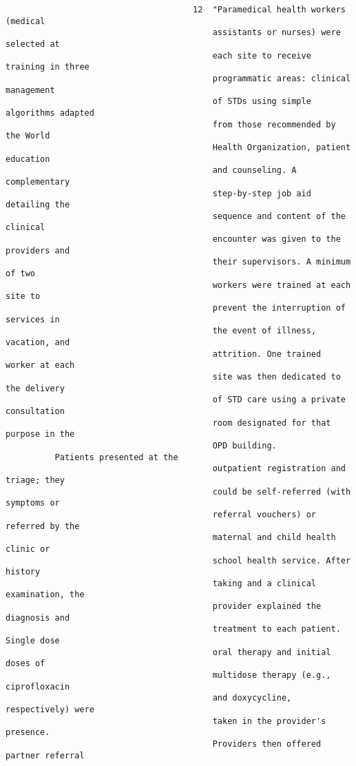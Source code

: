 \documentclass{article}
\begin{document}
\begin{verbatim}
                                      12  "Paramedical health workers (medical
                                          assistants or nurses) were selected at
                                          each site to receive training in three
                                          programmatic areas: clinical management
                                          of STDs using simple algorithms adapted
                                          from those recommended by the World
                                          Health Organization, patient education
                                          and counseling. A complementary
                                          step-by-step job aid detailing the
                                          sequence and content of the clinical
                                          encounter was given to the providers and
                                          their supervisors. A minimum of two
                                          workers were trained at each site to
                                          prevent the interruption of services in
                                          the event of illness, vacation, and
                                          attrition. One trained worker at each
                                          site was then dedicated to the delivery
                                          of STD care using a private consultation
                                          room designated for that purpose in the
                                          OPD building.
          Patients presented at the
                                          outpatient registration and triage; they
                                          could be self-referred (with symptoms or
                                          referral vouchers) or referred by the
                                          maternal and child health clinic or
                                          school health service. After history
                                          taking and a clinical examination, the
                                          provider explained the diagnosis and
                                          treatment to each patient. Single dose
                                          oral therapy and initial doses of
                                          multidose therapy (e.g., ciprofloxacin
                                          and doxycycline, respectively) were
                                          taken in the provider's presence.
                                          Providers then offered partner referral

\end{verbatim}
\end{document}
